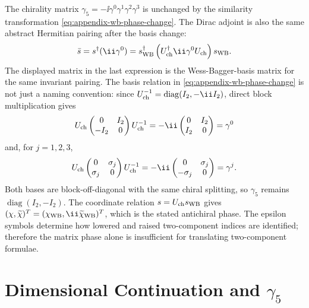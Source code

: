 The chirality matrix
\(\gamma_5=-\ii\gamma^0\gamma^1\gamma^2\gamma^3\) is unchanged by the
similarity transformation \eqref{eq:appendix-wb-phase-change}.  The Dirac
adjoint is also the same abstract Hermitian pairing after the basis change:
\[
  \bar s=s^\dagger(\ii\gamma^0)
  =
  s_{\rm WB}^\dagger
  \left(U_{\rm ch}^\dagger \ii\gamma^0 U_{\rm ch}\right)
  s_{\rm WB}.
\]
The displayed matrix in the last expression is the Wess-Bagger-basis matrix
for the same invariant pairing.  The basis relation in
\eqref{eq:appendix-wb-phase-change} is not just a naming convention: since
\(U_{\rm ch}^{-1}=\operatorname{diag}(I_2,-\ii I_2)\), direct block
multiplication gives
\[
  U_{\rm ch}
  \begin{pmatrix}0&I_2\\-I_2&0\end{pmatrix}
  U_{\rm ch}^{-1}
  =
  -\ii\begin{pmatrix}0&I_2\\I_2&0\end{pmatrix}
  =
  \gamma^0
\]
and, for \(j=1,2,3\),
\[
  U_{\rm ch}
  \begin{pmatrix}0&\sigma_j\\ \sigma_j&0\end{pmatrix}
  U_{\rm ch}^{-1}
  =
  -\ii\begin{pmatrix}0&\sigma_j\\-\sigma_j&0\end{pmatrix}
  =
  \gamma^j.
\]
Both bases are block-off-diagonal with the same chiral splitting, so
\(\gamma_5\) remains \(\operatorname{diag}(I_2,-I_2)\).  The coordinate
relation \(s=U_{\rm ch}s_{\rm WB}\) gives
\((\chi,\widetilde\chi)^T=(\chi_{\rm WB},\ii\widetilde\chi_{\rm WB})^T\),
which is the stated antichiral phase.  The epsilon symbols determine how
lowered and raised two-component indices are identified; therefore the
matrix phase alone is insufficient for translating two-component formulae.

\section{Dimensional Continuation and \texorpdfstring{\(\gamma_5\)}{gamma5}}

